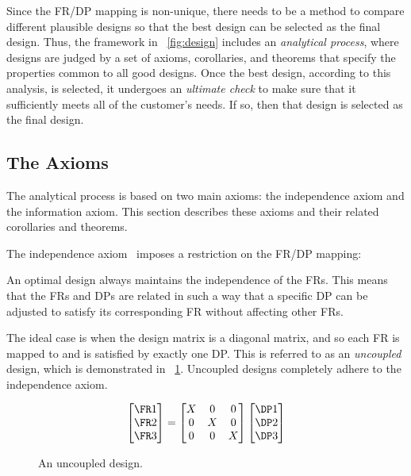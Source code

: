 Since the FR/DP mapping is non-unique, there needs to be a method to compare different plausible designs so that
the best design can be selected as the final design.  Thus, the framework in \figurename~\ref{fig:design} includes
an \emph{analytical process}, where designs are judged by a set of axioms, corollaries, and theorems that specify
the properties common to all good designs.  Once the best design, according to this analysis, is selected, it
undergoes an \emph{ultimate check} to make sure that it sufficiently meets all of the customer's needs.  If so,
then that design is selected as the final design.

\subsection{The Axioms}\label{sec:sub:axioms}

The analytical process is based on two main axioms: the independence axiom and the information axiom.  This section
describes these axioms and their related corollaries and theorems.

The independence axiom~\cite{suh} imposes a restriction on the FR/DP mapping:

\begin{axiom}
  \label{axm:independence}
  An optimal design always maintains the independence of the FRs.  This means that the FRs and DPs are related in
  such a way that a specific DP can be adjusted to satisfy its corresponding FR without affecting other FRs.
\end{axiom}

The ideal case is when the design matrix is a diagonal matrix, and so each FR is mapped to and is satisfied by
exactly one DP.  This is referred to as an \emph{uncoupled} design, which is demonstrated in
\figurename~\ref{fig:uncoupled}.  Uncoupled designs completely adhere to the independence axiom.

\begin{figure}[H]
  \label{fig:uncoupled}
  \begin{equation*}
    \begin{bmatrix}
      \FR1 \\ \FR2 \\ \FR3
    \end{bmatrix}=\begin{bmatrix}
    X & 0 & 0 \\
    0 & X & 0 \\
    0 & 0 & X
    \end{bmatrix}\begin{bmatrix}
      \DP1 \\ \DP2 \\ \DP3
    \end{bmatrix}
  \end{equation*}
  \caption{An uncoupled design.}
\end{figure}

